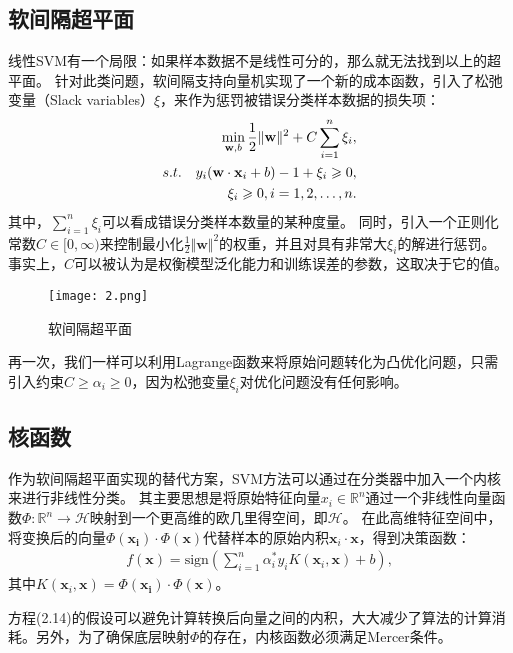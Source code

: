 \subsection{软间隔超平面}

线性SVM有一个局限：如果样本数据不是线性可分的，那么就无法找到以上的超平面。
针对此类问题，软间隔支持向量机实现了一个新的成本函数，引入了松弛变量（Slack variables）$\xi$，来作为惩罚被错误分类样本数据的损失项：
\begin{align}
    \min_{\mathbf{w},b}\frac{1}{2}\Vert\mathbf{w}\Vert^2+C\sum_{i=1}^n\xi_i,\\
    s.t.\quad y_i(\mathbf{w}\cdot\mathbf{x}_i+b)-1+\xi_i\geq0,\notag\\
    \xi_i\geq0,i=1,2,\ldots,n.\notag
\end{align}
其中，$\sum_{i=1}^n\xi_i$可以看成错误分类样本数量的某种度量。
同时，引入一个正则化常数$C\in[0,\infty)$来控制最小化$\frac{1}{2}\Vert\mathbf{w}\Vert^2$的权重，并且对具有非常大$\xi_i$的解进行惩罚。
事实上，$C$可以被认为是权衡模型泛化能力和训练误差的参数，这取决于它的值。

\begin{figure}[ht]
    \centering
    \texttt{[image: 2.png]}
    \caption{软间隔超平面}
\end{figure}

再一次，我们一样可以利用Lagrange函数来将原始问题转化为凸优化问题，只需引入约束$C\geq\alpha_i\geq0$，因为松弛变量$\xi_i$对优化问题没有任何影响。

\subsection{核函数}

作为软间隔超平面实现的替代方案，SVM方法可以通过在分类器中加入一个内核来进行非线性分类。
其主要思想是将原始特征向量$x_i\in\mathbb{R}^n$通过一个非线性向量函数$\Phi: \mathbb{R}^n\to\mathcal{H}$映射到一个更高维的欧几里得空间，即$\mathcal{H}$。
在此高维特征空间中，将变换后的向量$\Phi(\mathbf{x_i})\cdot\Phi(\mathbf{x})$代替样本的原始内积$\mathbf{x}_i\cdot\mathbf{x}$，得到决策函数：
\begin{align}
    f(\mathbf{x})=\mathrm{sign}(\sum_{i=1}^n\alpha_i^*y_iK(\mathbf{x}_i,\mathbf{x})+b),
\end{align}
其中$K(\mathbf{x}_i,\mathbf{x})=\Phi(\mathbf{x_i})\cdot\Phi(\mathbf{x})$。

方程(2.14)的假设可以避免计算转换后向量之间的内积，大大减少了算法的计算消耗。另外，为了确保底层映射$\Phi$的存在，内核函数必须满足Mercer条件\cite{en1}。

